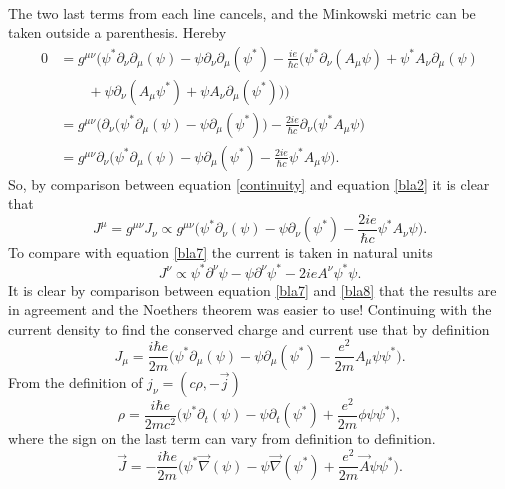 \begin{example}
\begin{equation}
\begin{split}
		\end{split}
	\end{equation} 
	The two last terms from each line cancels, and the Minkowski metric can be taken outside a parenthesis. Hereby
	\begin{equation}
		\begin{split}
			0&=g^{\mu\nu}\bigg(\psi^*\partial_\nu\partial_\mu(\psi)-\psi\partial_\nu\partial_\mu(\psi^*)-\frac{ie}{\hbar c}\bigg(\psi^*\partial_\nu(A_\mu\psi)+\psi^*A_\nu\partial_\mu(\psi)\\
			&\qquad+\psi\partial_\nu(A_\mu\psi^*)+\psi A_\nu\partial_\mu(\psi^*)\bigg)\bigg)\\
			&=g^{\mu\nu}\bigg(\partial_\nu\bigg(\psi^*\partial_\mu(\psi)-\psi\partial_\mu(\psi^*)\bigg)-\frac{2ie}{\hbar c}\partial_\nu\bigg(\psi^*A_\mu\psi\bigg)\\
			&=g^{\mu\nu}\partial_\nu\bigg(\psi^*\partial_\mu(\psi)-\psi\partial_\mu(\psi^*)-\frac{2ie}{\hbar c}\psi^*A_\mu\psi\bigg).
		\end{split}
		\label{bla2}
	\end{equation} 
	So, by comparison between equation \ref{continuity} and equation \ref{bla2} it is clear that
	\begin{equation}
		J^\mu=g^{\mu\nu}J_{\nu}\propto g^{\mu\nu}\bigg(\psi^*\partial_\nu(\psi)-\psi\partial_\nu(\psi^*)-\frac{2ie}{\hbar c}\psi^*A_\nu\psi\bigg).
	\end{equation} 
	To compare with equation \ref{bla7} the current is taken in natural units
	\begin{equation}
		J^\nu\propto\psi^*\partial^\nu\psi-\psi\partial^\nu\psi^*-2ieA^\nu\psi^*\psi.
		\label{bla8}
	\end{equation} 
	It is clear by comparison between equation \ref{bla7} and \ref{bla8} that the results are in agreement and the Noethers theorem was easier to use! Continuing with the current density to find the conserved charge and current use that by definition
	\begin{equation}
		J_\mu=\frac{i\hbar e}{2m}\bigg(\psi^*\partial_\mu(\psi)-\psi\partial_\mu(\psi^*)-\frac{e^2}{2m}A_\mu\psi\psi^*\bigg).
	\end{equation} 
	From the definition of $j_\nu=(c\rho, -\vec{j})$
	\begin{equation}
		\rho=\frac{i\hbar e}{2mc^2}\bigg(\psi^*\partial_t(\psi)-\psi\partial_t(\psi^*)+\frac{e^2}{2m}\phi\psi\psi^*\bigg),
	\end{equation} 
	where the sign on the last term can vary from definition to definition.
	\begin{equation}
		\vec{J}=-\frac{i\hbar e}{2m}\bigg(\psi^*\vec{\nabla}(\psi)-\psi\vec{\nabla}(\psi^*)+\frac{e^2}{2m}\vec{A}\psi\psi^*\bigg).
	\end{equation} 
\end{example}

